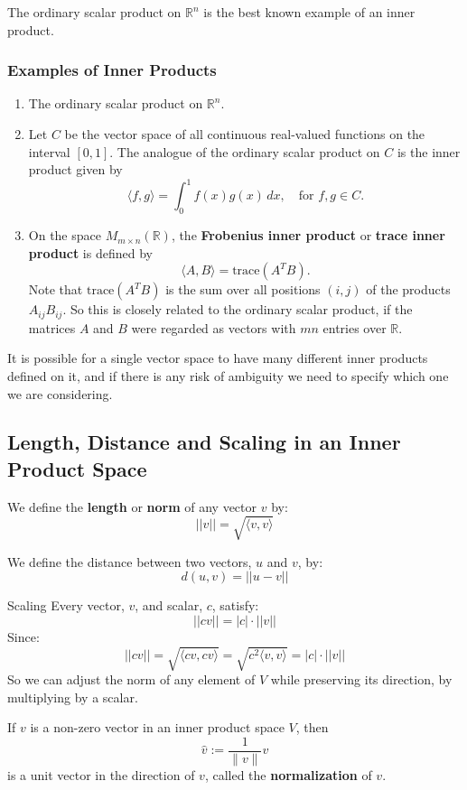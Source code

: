\documentclass[a4paper, 9pt]{extarticle}
\begin{document}
The ordinary scalar product on $\mathbb{R}^n$ is the best known example of an inner product.
\subsubsection{Examples of Inner Products}
\begin{enumerate}
  \item The ordinary scalar product on $\mathbb{R}^n$.

  \item Let $C$ be the vector space of all continuous real-valued functions on the interval $[0, 1]$. The analogue of the ordinary scalar product on $C$ is the inner product given by
        $$
          \langle f, g \rangle = \int_0^1 f(x)g(x)\, dx, \quad \text{for } f, g \in C.
        $$

  \item On the space $M_{m \times n}(\mathbb{R})$, the \textbf{Frobenius inner product} or \textbf{trace inner product} is defined by
        $$
          \langle A, B \rangle = \text{trace}(A^T B).
        $$
        Note that $\text{trace}(A^T B)$ is the sum over all positions $(i,j)$ of the products $A_{ij}B_{ij}$. So this is closely related to the ordinary scalar product, if the matrices $A$ and $B$ were regarded as vectors with $mn$ entries over $\mathbb{R}$.
\end{enumerate}

It is possible for a single vector space to have many different inner products defined on it, and if there is any risk of ambiguity we need to specify which one we are considering.
\subsection{Length, Distance and Scaling in an Inner Product Space}
\begin{definitionbox}{}{}
  We define the \textbf{length} or \textbf{norm} of any vector $v$ by:
  $$
    ||v|| = \sqrt{\langle v, v \rangle}
  $$
\end{definitionbox}
\begin{definitionbox}{}{}
  We define the distance between two vectors, $u$ and $v$, by:
  $$
    d(u, v) = ||u - v||
  $$
\end{definitionbox}
\begin{conceptbox}{Scaling}{}
  Every vector, $v$, and scalar, $c$, satisfy:
  $$
    ||cv|| = |c| \cdot ||v||
  $$
  Since:
  $$
    ||cv|| = \sqrt{\langle cv, cv \rangle} = \sqrt{c^2\langle v, v \rangle} = |c| \cdot ||v||
  $$
  So we can adjust the norm of any element of $V$ while preserving its direction, by multiplying by a scalar.
\end{conceptbox}
\begin{definitionbox}{}{}
  If $v$ is a non-zero vector in an inner product space $V$, then
  $$
    \hat{v} := \frac{1}{\|v\|}v
  $$
  is a unit vector in the direction of $v$, called the \textbf{normalization} of $v$.
\end{definitionbox}
\end{document}
